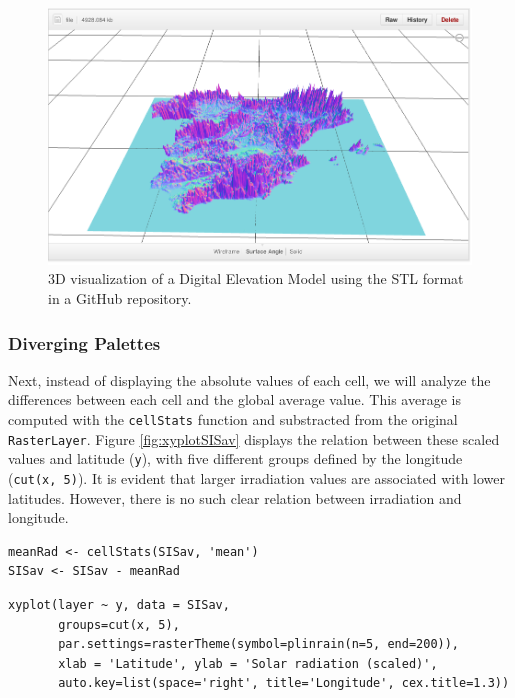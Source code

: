 \documentclass[smallroyalvopaper]{memoir}
\begin{document}
\begin{figure}
\includegraphics[height=0.3\textheight]{figs/DEM_STL_GitHub.png}
\caption{\label{fig:DEM_STL}3D visualization of a Digital Elevation
  Model using the STL format in a GitHub repository.}
\end{figure}

\subsubsection{Diverging Palettes}
\label{sec-1-1-3}
Next, instead of displaying the absolute values of each cell, we will
analyze the differences between each cell and the global average
value. This average is computed with the \texttt{cellStats} function and
substracted from the original \texttt{RasterLayer}. Figure
\ref{fig:xyplotSISav} displays the relation between these scaled
values and latitude (\texttt{y}), with five different groups defined by the
longitude (\texttt{cut(x, 5)}). It is evident that larger irradiation values
are associated with lower latitudes. However, there is no such clear
relation between irradiation and longitude.


\lstset{language=R,numbers=none}
\begin{lstlisting}
meanRad <- cellStats(SISav, 'mean')
SISav <- SISav - meanRad
\end{lstlisting}


\lstset{language=R,numbers=none}
\begin{lstlisting}
xyplot(layer ~ y, data = SISav,
       groups=cut(x, 5),
       par.settings=rasterTheme(symbol=plinrain(n=5, end=200)),
       xlab = 'Latitude', ylab = 'Solar radiation (scaled)',  
       auto.key=list(space='right', title='Longitude', cex.title=1.3))
\end{lstlisting}
\end{document}
